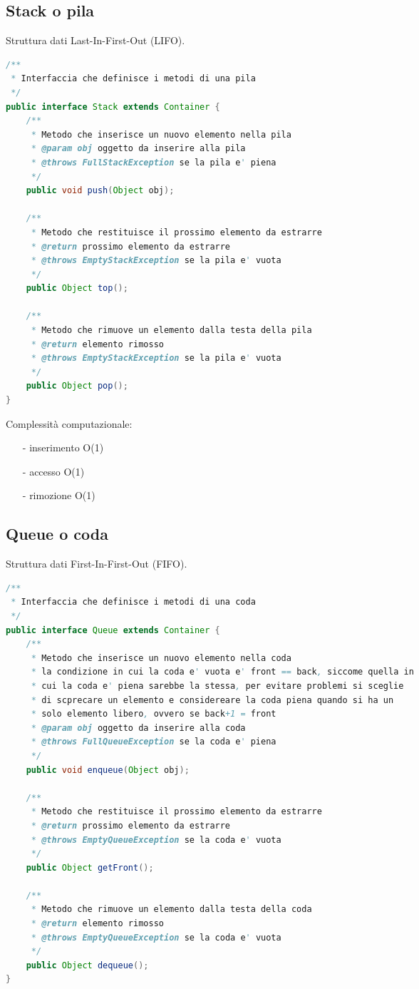 \documentclass{article}
\begin{document}
\subsection{Stack o pila}
Struttura dati Last-In-First-Out (LIFO).

\begin{lstlisting}[language=Java]
/**
 * Interfaccia che definisce i metodi di una pila
 */
public interface Stack extends Container {
	/**
	 * Metodo che inserisce un nuovo elemento nella pila
	 * @param obj oggetto da inserire alla pila
	 * @throws FullStackException se la pila e' piena
	 */
	public void push(Object obj);

	/**
	 * Metodo che restituisce il prossimo elemento da estrarre
	 * @return prossimo elemento da estrarre
	 * @throws EmptyStackException se la pila e' vuota
	 */
	public Object top();
	
	/**
	 * Metodo che rimuove un elemento dalla testa della pila
	 * @return elemento rimosso
	 * @throws EmptyStackException se la pila e' vuota
	 */
	public Object pop();
}
\end{lstlisting}

Complessità computazionale:
\begin{itemize} [topsep=3pt, itemsep=0pt]
	\item[-] inserimento O(1)
	\item[-] accesso O(1)
	\item[-] rimozione O(1)
\end{itemize}

\newpage

\subsection{Queue o coda}
Struttura dati First-In-First-Out (FIFO).
\begin{lstlisting}[language=Java]
/**
 * Interfaccia che definisce i metodi di una coda
 */
public interface Queue extends Container {
	/**
	 * Metodo che inserisce un nuovo elemento nella coda
	 * la condizione in cui la coda e' vuota e' front == back, siccome quella in
	 * cui la coda e' piena sarebbe la stessa, per evitare problemi si sceglie
	 * di scprecare un elemento e considereare la coda piena quando si ha un
	 * solo elemento libero, ovvero se back+1 = front
	 * @param obj oggetto da inserire alla coda
	 * @throws FullQueueException se la coda e' piena
	 */
	public void enqueue(Object obj);

	/**
	 * Metodo che restituisce il prossimo elemento da estrarre
	 * @return prossimo elemento da estrarre
	 * @throws EmptyQueueException se la coda e' vuota
	 */
	public Object getFront();
	
	/**
	 * Metodo che rimuove un elemento dalla testa della coda
	 * @return elemento rimosso
	 * @throws EmptyQueueException se la coda e' vuota
	 */
	public Object dequeue();
}   
\end{lstlisting}
\end{document}
